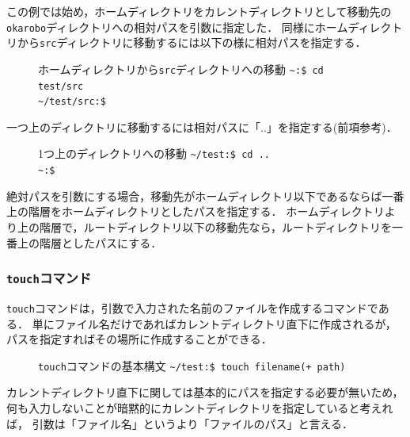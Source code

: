 \documentclass[autodetect-engine,dvi=dvipdfmx,ja=standard,a4j]{bxjsarticle}
\newcommand{\cmd}[1]{\textcolor{yellow!70!white} {#1}}
\newcommand{\dirpath}[1]{\textcolor{Cerulean}{#1}}
\newcommand{\prompt}[1]{\texttt{\dirpath{#1}:\$ }}
\newcommand{\termtext}[2]{\Large{\prompt{#1}\texttt{#2}}}
\begin{document}
この例では始め，ホームディレクトリをカレントディレクトリとして移動先の\verb|okarobo|ディレクトリへの相対パスを引数に指定した．
同様にホームディレクトリから\verb|src|ディレクトリに移動するには以下の様に相対パスを指定する．


\begin{figure}[H]
    \begin{terminal}{ホームディレクトリから\texttt{src}ディレクトリへの移動}
        \termtext{\textasciitilde}{\cmd{cd} test/src} \\
        \termtext{\textasciitilde/test/src}{}
    \end{terminal}
\end{figure}

一つ上のディレクトリに移動するには相対パスに「..」を指定する(前項参考)．

\begin{figure}[H]
    \begin{terminal}{1つ上のディレクトリへの移動}
        \termtext{\textasciitilde/test}{\cmd{cd} ..} \\
        \termtext{\textasciitilde}{}
    \end{terminal}
\end{figure}

絶対パスを引数にする場合，移動先がホームディレクトリ以下であるならば一番上の階層をホームディレクトリとしたパスを指定する．
ホームディレクトリより上の階層で，ルートディレクトリ以下の移動先なら，ルートディレクトリを一番上の階層としたパスにする．

\subsubsection{\texttt{touch}コマンド}
\verb|touch|コマンドは，引数で入力された名前のファイルを作成するコマンドである．
単にファイル名だけであればカレントディレクトリ直下に作成されるが，パスを指定すればその場所に作成することができる．

\begin{figure}[H]
    \begin{terminal}{\texttt{touch}コマンドの基本構文}
        \termtext{\textasciitilde/test}{\cmd{touch} filename(+ path)}
    \end{terminal}
\end{figure}

カレントディレクトリ直下に関しては基本的にパスを指定する必要が無いため，何も入力しないことが暗黙的にカレントディレクトリを指定していると考えれば，
引数は「ファイル名」というより「ファイルのパス」と言える．
\end{document}
